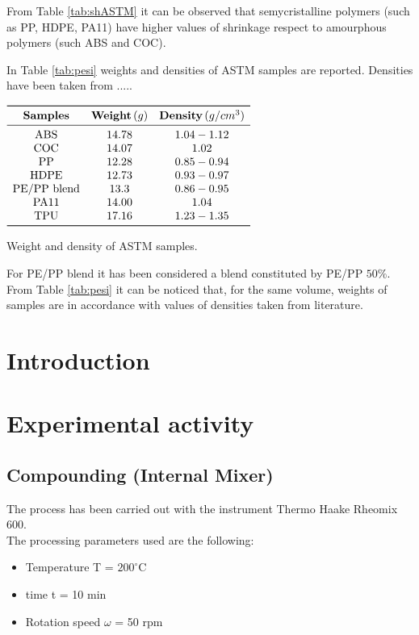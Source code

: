 \documentclass[a4paper, 11pt]{article}
\begin{document}
From Table \ref{tab:shASTM} it can be observed that semycristalline polymers (such as PP, HDPE, PA11) have higher values of shrinkage respect to amourphous polymers (such ABS and COC).

In Table \ref{tab:pesi} weights and densities of ASTM samples are reported. Densities have been taken from .....

\begin{table}[htp]
\centering
$
\begin{array}{ccc}
\toprule
\textbf{Samples} & \textbf{Weight}\,(g) & \textbf{Density}\,(g/cm^3) \\
\midrule
\text{ABS} & 14.78 & 1.04-1.12  \\
\text{COC} & 14.07 & 1.02 \\
\text{PP} & 12.28 & 0.85-0.94 \\
\text{HDPE} & 12.73 & 0.93-0.97 \\
\text{PE/PP blend} & 13.3 & 0.86-0.95 \\
\text{PA11} & 14.00 & 1.04 \\
\text{TPU} & 17.16 & 1.23-1.35 \\
\bottomrule
\end{array}
$
\caption{Weight and density of ASTM samples.}
\label{tab:pesi}
\end{table}

For PE/PP blend it has been considered a blend constituted by PE/PP $50\%$. From Table \ref{tab:pesi} it can be noticed that, for the same volume, weights of samples are in accordance with values of densities taken from literature. 

\section{Introduction}

\section{Experimental activity}

\subsection{Compounding (Internal Mixer)}

The process has been carried out with the instrument Thermo Haake Rheomix 600.\\
The processing parameters used are the following:

\begin{itemize}
\item Temperature T = $200^\circ$C
\item time t = 10 min
\item Rotation speed $\omega$ = 50 rpm
\end{itemize}
\end{document}
